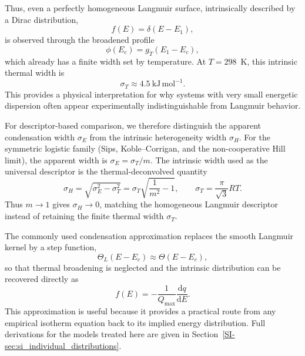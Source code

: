\documentclass[journal=jacsat,manuscript=article]{achemso}
\begin{document}
	Thus, even a perfectly homogeneous Langmuir surface, intrinsically described by a Dirac distribution,
	\begin{equation}
		f(E) = \delta(E-E_1),
		\label{eq:delta_langmuir}
	\end{equation}
	is observed through the broadened profile
	\begin{equation}
		\phi(E_c) = g_T(E_1-E_c),
		\label{eq:single_site_broadened}
	\end{equation}
	which already has a finite width set by temperature. At $T=298$~K, this intrinsic thermal width is
	\begin{equation}
		\sigma_T \approx 4.5~\mathrm{kJ\,mol^{-1}}.
	\end{equation}
	This provides a physical interpretation for why systems with very small energetic dispersion often appear experimentally indistinguishable from Langmuir behavior.
	
	For descriptor-based comparison, we therefore distinguish the apparent condensation width $\sigma_E$ from the intrinsic heterogeneity width $\sigma_H$. For the symmetric logistic family (Sips, Koble--Corrigan, and the non-cooperative Hill limit), the apparent width is $\sigma_E = \sigma_T/m$. The intrinsic width used as the universal descriptor is the thermal-deconvolved quantity
	\begin{equation}
		\sigma_H = \sqrt{\sigma_E^2 - \sigma_T^2}
		= \sigma_T\sqrt{\frac{1}{m^2}-1},
		\qquad \sigma_T = \frac{\pi}{\sqrt{3}}RT.
		\label{eq:sigmaH_definition}
	\end{equation}
	Thus $m\to1$ gives $\sigma_H\to0$, matching the homogeneous Langmuir descriptor instead of retaining the finite thermal width $\sigma_T$.
	
	The commonly used condensation approximation replaces the smooth Langmuir kernel by a step function,
	\begin{equation}
		\Theta_L(E-E_c) \approx \Theta(E-E_c),
		\label{eq:condensation_step}
	\end{equation}
	so that thermal broadening is neglected and the intrinsic distribution can be recovered directly as
	\begin{equation}
		f(E)
		=
		-\frac{1}{Q_{\max}}\frac{\mathrm{d}q}{\mathrm{d}E}.
		\label{eq:fE_general}
	\end{equation}
	This approximation is useful because it provides a practical route from any empirical isotherm equation back to its implied energy distribution. Full derivations for the models treated here are given in Section~\ref{SI-sec:si_individual_distributions}.
	
\end{document}
